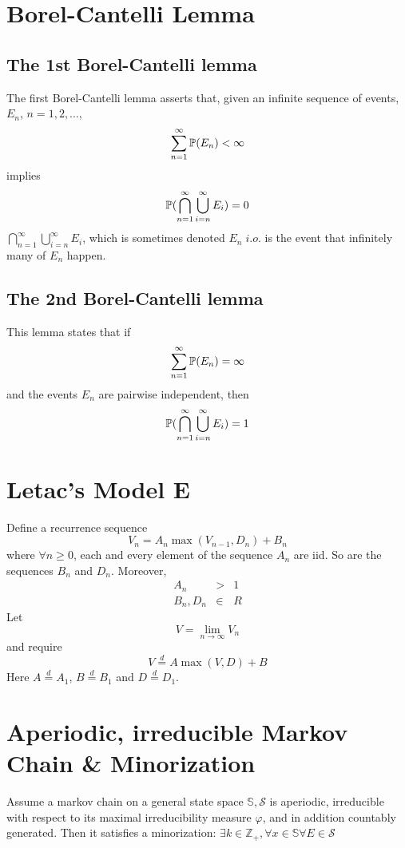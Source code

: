 \documentclass[12pt]{article}
\begin{document}
\maketitle

\section{Borel-Cantelli Lemma}
\subsection{The 1st Borel-Cantelli lemma}
The first Borel-Cantelli lemma asserts that, given an infinite
sequence of events, $E_n$, $n = 1, 2, \dots$,
\[
\sum_{n=1}^\infty \P(E_n) < \infty
\]
implies
\[
\P(\bigcap_{n=1}^\infty \bigcup_{i=n}^\infty E_i) = 0
\]
$\bigcap_{n=1}^\infty \bigcup_{i=n}^\infty E_i$, which is sometimes
denoted $E_n\;i.o.$ is the event that infinitely many of $E_n$
happen.

\subsection{The 2nd Borel-Cantelli lemma}
This lemma states that if
\[
\sum_{n=1}^\infty \P(E_n) = \infty
\]
and the events $E_n$ are pairwise independent, then
\[
\P(\bigcap_{n=1}^\infty \bigcup_{i=n}^\infty E_i) = 1
\]

\section{Letac's Model E}
Define a recurrence sequence
\[
V_n = A_n \max(V_{n-1}, D_n) + B_n
\]
where $\forall n \geq 0$, each and every element of the sequence $A_n$
are iid. So are the sequences $B_n$ and $D_n$. Moreover,
\begin{eqnarray*}
  A_n &>& 1 \\
  B_n, D_n &\in& R
\end{eqnarray*}
Let
\[
V = \lim_{n \to \infty} V_n
\]
and require
\[
V  \overset{d}{=} A \max(V, D) + B
\]
Here $A \overset{d}{=} A_1$, $B \overset{d}{=} B_1$ and $D \overset{d}{=} D_1$.
\section{Aperiodic, irreducible Markov Chain \& Minorization}
Assume a markov chain on a general state space $\mathbb S, \mathcal S$
is aperiodic, irreducible with respect to its maximal irreducibility
measure $\varphi$, and in addition countably generated. Then it satisfies
a minorization: $\exists k \in \mathbb Z_+, \forall x \in \mathbb S
\forall E \in \mathcal S$
\end{document}
